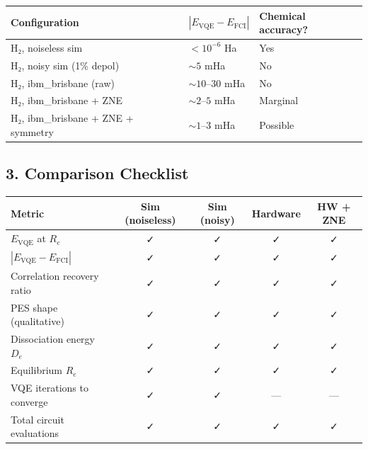 \documentclass[
  11pt,
]{report}
\newcounter{none} %
\begin{document}
{\def\LTcaptype{none} %
\begin{longtable}[]{@{}
  >{\raggedright\arraybackslash}p{}
  >{\centering\arraybackslash}p{}
  >{\centering\arraybackslash}p{}@{}}
\toprule\noalign{}
\begin{minipage}[b]{\linewidth}\raggedright
Configuration
\end{minipage} & \begin{minipage}[b]{\linewidth}\centering
\(|E_{\text{VQE}} - E_{\text{FCI}}|\)
\end{minipage} & \begin{minipage}[b]{\linewidth}\centering
Chemical accuracy?
\end{minipage} \\
\midrule\noalign{}
\endhead
\bottomrule\noalign{}
\endlastfoot
H₂, noiseless sim & \(< 10^{-6}\) Ha & Yes \\
H₂, noisy sim (1\% depol) & \(\sim 5\) mHa & No \\
H₂, ibm\_brisbane (raw) & \(\sim 10\)--\(30\) mHa & No \\
H₂, ibm\_brisbane + ZNE & \(\sim 2\)--\(5\) mHa & Marginal \\
H₂, ibm\_brisbane + ZNE + symmetry & \(\sim 1\)--\(3\) mHa & Possible \\
\end{longtable}
}

\subsection{3. Comparison Checklist}\label{comparison-checklist}

{\def\LTcaptype{none} %
\begin{longtable}[]{@{}lcccc@{}}
\toprule\noalign{}
Metric & Sim (noiseless) & Sim (noisy) & Hardware & HW + ZNE \\
\midrule\noalign{}
\endhead
\bottomrule\noalign{}
\endlastfoot
\(E_{\text{VQE}}\) at \(R_e\) & ✓ & ✓ & ✓ & ✓ \\
\(|E_{\text{VQE}} - E_{\text{FCI}}|\) & ✓ & ✓ & ✓ & ✓ \\
Correlation recovery ratio & ✓ & ✓ & ✓ & ✓ \\
PES shape (qualitative) & ✓ & ✓ & ✓ & ✓ \\
Dissociation energy \(D_e\) & ✓ & ✓ & ✓ & ✓ \\
Equilibrium \(R_e\) & ✓ & ✓ & ✓ & ✓ \\
VQE iterations to converge & ✓ & ✓ & --- & --- \\
Total circuit evaluations & ✓ & ✓ & ✓ & ✓ \\
\end{longtable}
}
\end{document}
